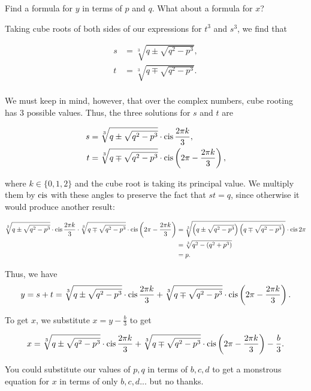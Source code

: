 \documentclass[../key.tex]{subfiles}
\begin{document}
\begin{inner_problem}
\item Find a formula for $y$ in terms of $p$ and $q$. What about a formula for $x$?
\end{inner_problem}

Taking cube roots of both sides of our expressions for $t^3$ and $s^3$, we find that

\begin{align*}
s&=\sqrt[3]{q \pm \sqrt{q^2 - p^3}}, \\
t&=\sqrt[3]{q \mp \sqrt{q^2 - p^3}}. \\
\end{align*}

We must keep in mind, however, that over the complex numbers, cube rooting has $3$ possible values. Thus, the three solutions for $s$ and $t$ are

\begin{align*}
s&=\sqrt[3]{q \pm \sqrt{q^2 - p^3}}\cdot \operatorname{cis} \frac{2\pi k}{3}, \\
t&=\sqrt[3]{q \mp \sqrt{q^2 - p^3}}\cdot \operatorname{cis} \left(2\pi - \frac{2\pi k}{3}\right), \\
\end{align*}

where $k\in \{0,1,2\}$ and the cube root is taking its principal value. We multiply them by $\operatorname{cis}$ with these angles to preserve the fact that $st = q$, since otherwise it would produce another result:

\begin{align*}
\sqrt[3]{q \pm \sqrt{q^2 - p^3}}\cdot \operatorname{cis} \frac{2\pi k}{3} \cdot \sqrt[3]{q \mp \sqrt{q^2 - p^3}}\cdot \operatorname{cis} \left(2\pi - \frac{2\pi k}{3}\right) &= \sqrt[3]{\left(q \pm \sqrt{q^2 - p^3}\right)\left(q \mp \sqrt{q^2 - p^3}\right)}\cdot \operatorname{cis} 2\pi \\
&= \sqrt[3]{q^2 - (q^2 + p^3)} \\
&= p.
\end{align*}

Thus, we have $$y=s+t=\sqrt[3]{q \pm \sqrt{q^2 - p^3}} \cdot \operatorname{cis} \frac{2\pi k}{3} + \sqrt[3]{q \mp \sqrt{q^2 - p^3}} \cdot \operatorname{cis} \left(2\pi - \frac{2\pi k}{3}\right).$$

To get $x$, we substitute $x=y-\frac{b}{3}$ to get

$$x= \sqrt[3]{q \pm \sqrt{q^2 - p^3}} \cdot \operatorname{cis} \frac{2\pi k}{3} + \sqrt[3]{q \mp \sqrt{q^2 - p^3}} \cdot \operatorname{cis} \left(2\pi - \frac{2\pi k}{3}\right) - \frac{b}{3}.$$

You could substitute our values of $p,q$ in terms of $b,c,d$ to get a monstrous equation for $x$ in terms of only $b,c,d$... but no thanks.
\end{document}
